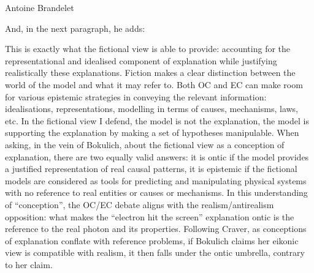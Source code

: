 \begin{artengenv}{Antoine Brandelet}

And, in the next paragraph, he adds:


This is exactly what the fictional view is able to provide: accounting for the representational and idealised component of explanation while justifying realistically these explanations. Fiction makes a clear distinction between the world of the model and what it may refer to. Both OC and EC can make room for various epistemic strategies in conveying the relevant information: idealisations, representations, modelling in terms of causes, mechanisms, laws, etc. In the fictional view I defend, the model is not the explanation, the model is supporting the explanation by making a set of hypotheses manipulable. When asking, in the vein of Bokulich, about the fictional view as a conception of explanation, there are two equally valid answers: it is ontic if the model provides a justified representation of real causal patterns, it is epistemic if the fictional models are considered as tools for predicting and manipulating physical systems with no reference to real entities or causes or mechanisms. In this understanding of ``conception'', the OC/EC debate aligns with the realism/antirealism opposition: what makes the ``electron hit the screen'' explanation ontic is the reference to the real photon and its properties. Following Craver, as conceptions of explanation conflate with reference problems, if Bokulich claims her eikonic view is compatible with realism, it then falls under the ontic umbrella, contrary to her claim.


\end{artengenv}
